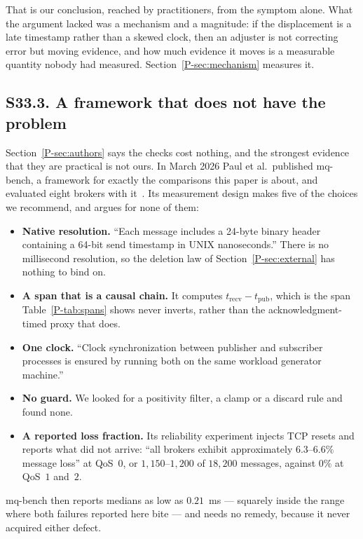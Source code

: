 \documentclass[10pt,journal,onecolumn]{IEEEtran}
\newcommand{\mainModeB}{\ref{P-sec:external}}              %
\newcommand{\mainModeA}{\ref{P-sec:mechanism}}             %
\newcommand{\mainAuthors}{\ref{P-sec:authors}}        %
\begin{document}
That is our conclusion, reached by practitioners, from the symptom alone. What the argument
lacked was a mechanism and a magnitude: if the displacement is a late timestamp rather than a
skewed clock, then an adjuster is not correcting error but moving evidence, and how much
evidence it moves is a measurable quantity nobody had measured. Section~\mainModeA{} measures
it.

\subsection{S33.3. A framework that does not have the problem}

Section~\mainAuthors{} says the checks cost nothing, and the strongest evidence that they are
practical is not ours. In March 2026 Paul et al.\ published mq-bench, a
framework for exactly the comparisons this paper is about, and evaluated eight brokers with
it~\cite{mqbench2026}. Its measurement design makes five of the choices we recommend, and
argues for none of them:

\begin{itemize}
\item \textbf{Native resolution.} ``Each message includes a 24-byte binary header containing a
64-bit send timestamp in UNIX nanoseconds.'' There is no millisecond resolution, so the deletion
law of Section~\mainModeB{} has nothing to bind on.
\item \textbf{A span that is a causal chain.} It computes $t_{\mathrm{recv}} -
t_{\mathrm{pub}}$, which is the span Table~\ref{P-tab:spans} shows never inverts, rather than the acknowledgment-timed proxy that does.
\item \textbf{One clock.} ``Clock synchronization between publisher and subscriber processes
is ensured by running both on the same workload generator machine.''
\item \textbf{No guard.} We looked for a positivity filter, a clamp or a discard rule and
found none.
\item \textbf{A reported loss fraction.} Its reliability experiment injects TCP resets and
reports what did not arrive: ``all brokers exhibit approximately $6.3$--$6.6\%$ message
loss'' at QoS~$0$, or $1{,}150$--$1{,}200$ of $18{,}200$ messages, against $0\%$ at QoS~$1$
and~$2$.
\end{itemize}

mq-bench then reports medians as low as $0.21$~ms --- squarely inside the range where both failures
reported here bite --- and needs no remedy, because it never acquired either defect.
\end{document}

